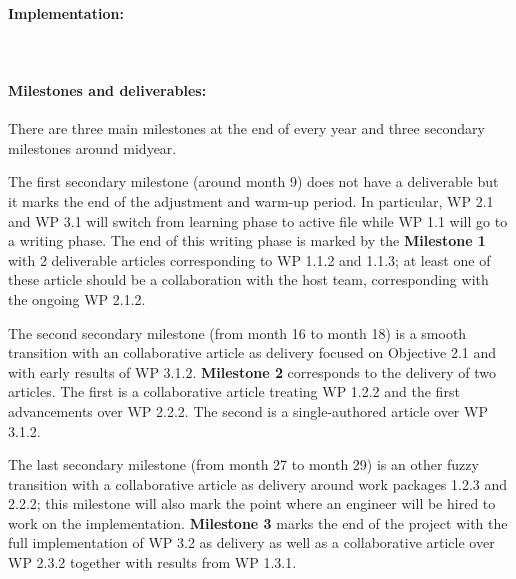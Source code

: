 \documentclass{article}[11pt]
\begin{document}
\paragraph{Implementation:}~\\


\paragraph{Milestones and deliverables:}

There are three main milestones at the end of every year and three secondary milestones around midyear.

The first secondary milestone (around month 9) does not have a deliverable but  it marks the end of the adjustment and warm-up period. In particular, WP 2.1 and WP 3.1 will switch from learning phase to active file while WP 1.1 will go to a writing phase. The end of this writing phase is marked by the {\bf Milestone 1} with 2 deliverable articles corresponding to WP 1.1.2 and 1.1.3; at least one of these article should be a collaboration with the host team, corresponding with the ongoing WP 2.1.2.

The second secondary milestone (from month 16 to month 18) is a smooth transition with an collaborative article as delivery focused on Objective 2.1 and with early results of WP 3.1.2. {\bf Milestone 2} corresponds to the delivery of two articles. The first is a collaborative article treating WP 1.2.2 and the first advancements over WP 2.2.2. The second is a single-authored article over WP 3.1.2.

The last secondary milestone (from month 27 to month 29) is an other fuzzy transition with a collaborative article as delivery around work packages 1.2.3 and 2.2.2; this milestone will also mark the point where an engineer will be hired to work on the implementation.  {\bf Milestone 3} marks the end of the project with the full implementation of WP 3.2 as delivery as well as a collaborative article over WP 2.3.2 together with results from WP 1.3.1.
\end{document}
